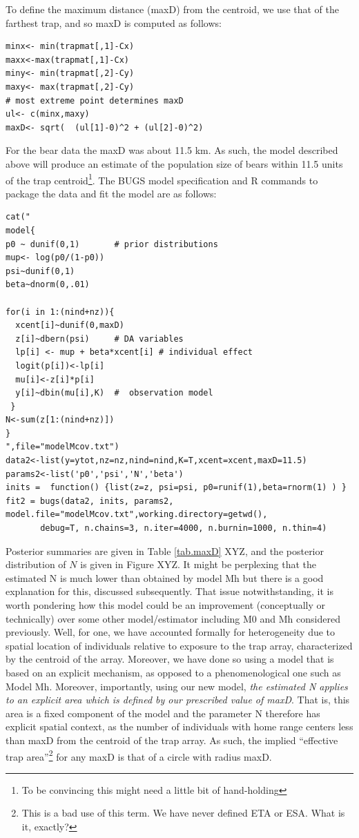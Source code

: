 To define the maximum distance (maxD) from the centroid, we use that
of the farthest trap, and so maxD is computed as follows:

\begin{verbatim}
minx<- min(trapmat[,1]-Cx)
maxx<-max(trapmat[,1]-Cx)
miny<- min(trapmat[,2]-Cy)
maxy<- max(trapmat[,2]-Cy)
# most extreme point determines maxD
ul<- c(minx,maxy)
maxD<- sqrt(  (ul[1]-0)^2 + (ul[2]-0)^2)
\end{verbatim}

For the bear data the maxD was about 11.5 km. As such, the model
described above will produce an estimate of the population size of
bears within 11.5 units of the trap centroid\footnote{To be convincing
  this might  need a little bit of hand-holding}. The BUGS model
specification and R commands to package the data and fit the model are
as follows:

\begin{verbatim}
cat("
model{
p0 ~ dunif(0,1)       # prior distributions
mup<- log(p0/(1-p0))
psi~dunif(0,1)
beta~dnorm(0,.01)

for(i in 1:(nind+nz)){
  xcent[i]~dunif(0,maxD)
  z[i]~dbern(psi)     # DA variables
  lp[i] <- mup + beta*xcent[i] # individual effect
  logit(p[i])<-lp[i]
  mu[i]<-z[i]*p[i]
  y[i]~dbin(mu[i],K)  #  observation model
 }
N<-sum(z[1:(nind+nz)])
}
",file="modelMcov.txt")
data2<-list(y=ytot,nz=nz,nind=nind,K=T,xcent=xcent,maxD=11.5)
params2<-list('p0','psi','N','beta')
inits =  function() {list(z=z, psi=psi, p0=runif(1),beta=rnorm(1) ) }
fit2 = bugs(data2, inits, params2, model.file="modelMcov.txt",working.directory=getwd(),
       debug=T, n.chains=3, n.iter=4000, n.burnin=1000, n.thin=4)
\end{verbatim}

Posterior summaries are given in Table \ref{tab.maxD} XYZ, and the posterior distribution of $N$ is given in Figure XYZ. It might be perplexing that the estimated N is much lower than obtained by model Mh but there is a good explanation for this, discussed subsequently. That issue notwithstanding, it is worth pondering how this model could be an improvement (conceptually or technically) over some other model/estimator including M0 and Mh considered previously. Well, for one, we have accounted formally for heterogeneity due to spatial location of individuals relative to exposure to the trap array, characterized by the centroid of the array. Moreover, we have done so using a model that is based on an explicit mechanism, as opposed to a phenomenological one such as Model Mh. Moreover, importantly, using our new model, {\it the estimated N applies to an explicit area which is defined by our prescribed value of maxD}. That is, this area is a fixed component of the model and the parameter N therefore has explicit spatial context, as the number of individuals with home range centers less than maxD from the centroid of the trap array. As such, the implied ``effective trap area''\footnote{This is a bad use of this term. We have never defined ETA or ESA. What is it, exactly?} for any maxD is that of a circle with radius maxD.

